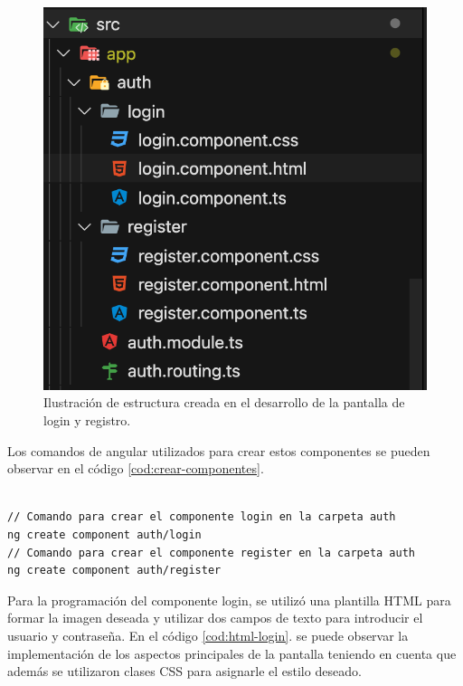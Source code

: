 \begin{figure}[htpb]
	\centering
	\includegraphics[scale=.50]{./Figures/estructura-login-vs.png}
	\caption[Estructura de componentes de login y registro]{Ilustración de estructura creada en el desarrollo de la pantalla de login y registro.}
	\label{fig:estructura-login}
\end{figure}

\pagebreak

Los comandos de angular utilizados para crear estos componentes se pueden observar en el código \ref{cod:crear-componentes}.

\begin{lstlisting}[label=cod:crear-componentes,caption=Comandos de Angular para crear componentes de login y registro.] 

// Comando para crear el componente login en la carpeta auth
ng create component auth/login
// Comando para crear el componente register en la carpeta auth
ng create component auth/register

\end{lstlisting} 

Para la programación del componente login, se utilizó una plantilla HTML para formar la imagen deseada y utilizar dos campos de texto para introducir el usuario y contraseña.  En el código \ref{cod:html-login}. se puede observar la implementación de los aspectos principales de la pantalla teniendo en cuenta que además se utilizaron clases CSS para asignarle el estilo deseado. 

